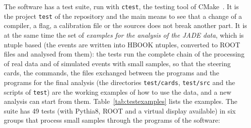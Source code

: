 The software has a test suite, run with \texttt{ctest}, the testing tool of CMake~\cite{CMake:web}. It is the project \texttt{test} of the
repository and the main means to see that a change of a compiler, a flag, a calibration file or the sources does not break another part.
It is at the same time the set of \emph{examples for the analysis of the JADE data}, which is ntuple based (the events are written into HBOOK ntuples, converted to ROOT files and analysed from them): the tests run the complete chain of the processing of real data and of simulated events with
small samples, so that the steering cards, the commands, the files exchanged between the programs and the programs for the final analysis (the directories \texttt{test/\allowbreak{}cards},
\texttt{test/\allowbreak{}src} and the scripts of \texttt{test}) are the working examples of how to use the data, and a new analysis can start from them. Table~\ref{tab:testexamples} lists the examples.
The suite has 49 tests (with Pythia8, ROOT and a virtual display available) in six groups that process small samples through the programs of the software:
